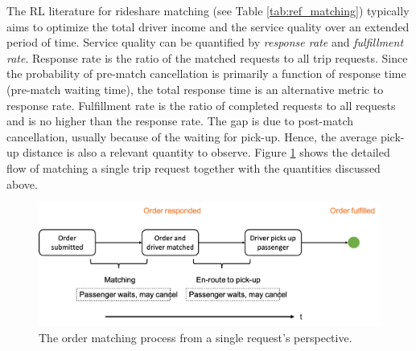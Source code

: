 \documentclass{article}
\newcommand{\tq}[1]{\textcolor{red}{#1}}
\begin{document}
The RL literature for rideshare matching (see Table \ref{tab:ref_matching}) typically aims to optimize the total driver income and the service quality over an extended period of time. Service quality can be quantified by \emph{response rate} and \emph{fulfillment rate}. Response rate is the ratio of the matched requests to all trip requests. Since the probability of pre-match cancellation is primarily a function of response time (pre-match waiting time), the total response time is an alternative metric to response rate. Fulfillment rate is the ratio of completed requests to all requests and is no higher than the response rate. The gap is due to post-match cancellation, usually because of the waiting for pick-up. 
Hence, the average pick-up distance is also a relevant quantity to observe. Figure \ref{fig:matching_process} shows the detailed flow of matching a single trip request together with the quantities discussed above.

\begin{figure}
\begin{center}
        \includegraphics[width=0.9\linewidth]{img/matching.png}
	\caption{The order matching process from a single request's perspective.}
	\label{fig:matching_process}
\end{center}
\end{figure}
\end{document}
